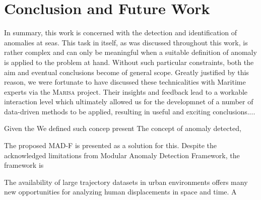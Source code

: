 \chapter{Conclusion and Future Work}
\label{chapter:Chapter6}

In summary, this work is concerned with the detection and identification of anomalies at seas. This task in itself, as was discussed throughout this work, is rather complex and can only be meaningful when a suitable definition of anomaly is applied to the problem at hand. Without such particular constraints, both the aim and eventual conclusions become of general scope. Greatly justified by this reason, we were fortunate to have discussed these technicalities with Maritime experts via the \textsc{Marisa} project. Their insights and feedback lead to a workable interaction level which ultimately allowed us for the developmnet of a number of data-driven methods to be applied, resulting in useful and exciting conclusions....


Given the We defined such concep 
present The concept of anomaly detected, 


The proposed MAD-F is presented as a solution for this. Despite the acknowledged limitations from Modular Anomaly Detection Framework, the framework is 

The availability of large trajectory datasets in urban environments offers many new opportunities
for analyzing human displacements in space and time. A